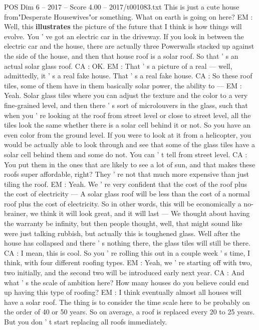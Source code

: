 \begin{textsample}{POS Dim 6 – 2017 – Score 4.00 – 2017/t001083.txt}
This is just a cute house from"Desperate Housewives"or something.
What on earth is going on here?
EM : Well, this \textbf{illustrates} the picture of the future that I think is how things will evolve.
You ' ve got an electric car in the driveway.
If you look in between the electric car and the house, there are actually three Powerwalls stacked up against the side of the house, and then that house roof is a solar roof.
So that ' s an actual solar glass roof.
CA : OK.
EM : That ' s a picture of a real — well, admittedly, it ' s a real fake house.
That ' s a real fake house.
CA : So these roof tiles, some of them have in them basically solar power, the ability to — EM : Yeah.
Solar glass tiles where you can adjust the texture and the color to a very fine-grained level, and then there ' s sort of microlouvers in the glass, such that when you ' re looking at the roof from street level or close to street level, all the tiles look the same whether there is a solar cell behind it or not.
So you have an even color from the ground level.
If you were to look at it from a helicopter, you would be actually able to look through and see that some of the glass tiles have a solar cell behind them and some do not.
You can ' t tell from street level.
CA : You put them in the ones that are likely to see a lot of sun, and that makes these roofs super affordable, right?
They ' re not that much more expensive than just tiling the roof.
EM : Yeah.
We ' re very confident that the cost of the roof plus the cost of electricity — A solar glass roof will be less than the cost of a normal roof plus the cost of electricity.
So in other words, this will be economically a no-brainer, we think it will look great, and it will last — We thought about having the warranty be infinity, but then people thought, well, that might sound like were just talking rubbish, but actually this is toughened glass.
Well after the house has collapsed and there ' s nothing there, the glass tiles will still be there.
CA : I mean, this is cool.
So you ' re rolling this out in a couple week ' s time, I think, with four different roofing types.
EM : Yeah, we ' re starting off with two, two initially, and the second two will be introduced early next year.
CA : And what ' s the scale of ambition here?
How many houses do you believe could end up having this type of roofing?
EM : I think eventually almost all houses will have a solar roof.
The thing is to consider the time scale here to be probably on the order of 40 or 50 years.
So on average, a roof is replaced every 20 to 25 years.
But you don ' t start replacing all roofs immediately.

\end{textsample}
